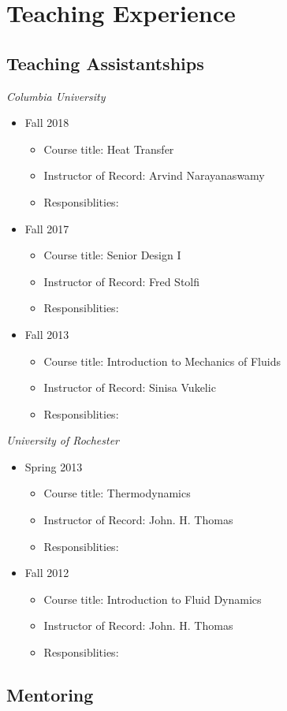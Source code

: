 \pagestyle{plain}
\chapter[Teaching Experience][Teaching Experience]{Teaching Experience}

\section{Teaching Assistantships}

\textit{Columbia University}
\begin{itemize}
\item Fall 2018 \vspace{-1em}
	\begin{itemize}
	\item Course title: Heat Transfer
	\item Instructor of Record: Arvind Narayanaswamy
	\item Responsiblities:
	\end{itemize}
\item Fall 2017 \vspace{-1em}
	\begin{itemize}
	\item Course title: Senior Design I
	\item Instructor of Record: Fred Stolfi
	\item Responsiblities:
	\end{itemize}
\item Fall 2013 \vspace{-1em}
	\begin{itemize}
	\item Course title: Introduction to Mechanics of Fluids
	\item Instructor of Record: Sinisa Vukelic
	\item Responsiblities:
	\end{itemize}
\end{itemize}


\textit{University of Rochester}
\begin{itemize}
\item Spring 2013 \vspace{-1em}
	\begin{itemize}
	\item Course title: Thermodynamics
	\item Instructor of Record: John. H. Thomas
	\item Responsiblities:
	\end{itemize}
\item Fall 2012 \vspace{-1em}
	\begin{itemize}
	\item Course title: Introduction to Fluid Dynamics
	\item Instructor of Record: John. H. Thomas
	\item Responsiblities:
	\end{itemize}
\end{itemize}



\section{Mentoring}

